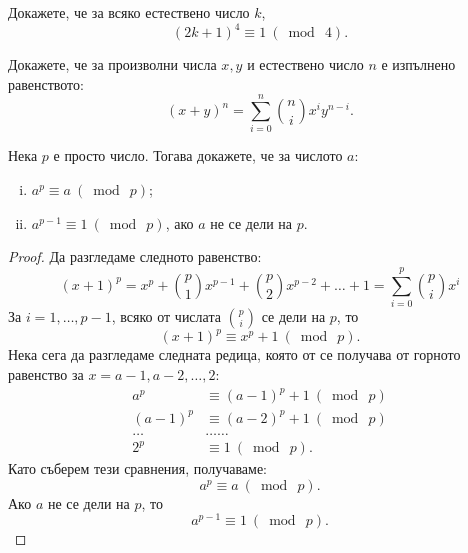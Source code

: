 

\begin{problem}
  Докажете, че за всяко естествено число $k$,
  \[(2k+1)^4 \equiv 1\ (\bmod\ 4).\]
\end{problem}

\begin{problem}
  Докажете, че за произволни числа $x,y$ и естествено число $n$ е изпълнено равенството:
  \[(x+y)^n = \sum^{n}_{i=0}\binom{n}{i}x^iy^{n-i}.\]
\end{problem}
\begin{problem}
  Нека $p$ е просто число. Тогава докажете, че за числото $a$:
  \begin{enumerate}[i)]
  \item
    $a^p \equiv a\ (\bmod\ p)$;
  \item 
    $a^{p-1} \equiv 1\ (\bmod\ p)$, ако $a$ не се дели на $p$.
  \end{enumerate}
\end{problem}
\begin{proof}
  Да разгледаме следното равенство:
  \[(x+1)^p = x^p + \binom{p}{1}x^{p-1} + \binom{p}{2}x^{p-2} + \dots + 1 = \sum^{p}_{i=0}\binom{p}{i}x^i\]
  За $i = 1,\dots,p-1$, всяко от числата $\binom{p}{i}$ се дели на $p$, то 
  \[(x+1)^p \equiv x^p + 1\ (\bmod\ p).\]
  Нека сега да разгледаме следната редица, която от се получава от горното равенство за $x = a-1,a-2,\dots,2$:
  \begin{align*}
    a^p & \equiv (a-1)^p+1\ (\bmod\ p)\\
    (a-1)^p & \equiv (a-2)^p+1\ (\bmod\ p)\\
    \dots & \dots\dots\\
    2^p & \equiv 1\ (\bmod\ p).
  \end{align*}
  Като съберем тези сравнения, получаваме:
  \[a^p \equiv a\ (\bmod\ p).\]
  Ако $a$ не се дели на $p$, то
  \[a^{p-1} \equiv 1\ (\bmod\ p).\]
\end{proof}

